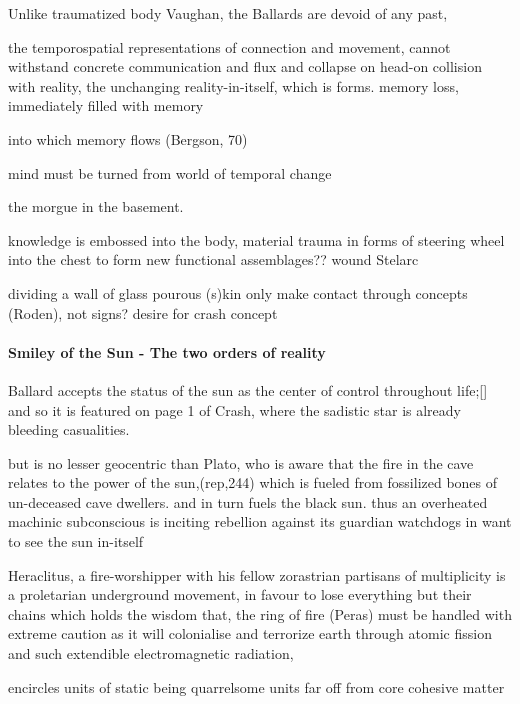 \documentclass{article}
\begin{document}
Unlike traumatized body Vaughan, 
the Ballards are devoid of any past, 


the temporospatial representations of connection and movement, 
cannot withstand concrete communication and flux and 
collapse
on head-on collision with reality,
the unchanging reality-in-itself, which is forms.
memory loss, 
 immediately filled with memory

into which memory flows (Bergson, 70)


mind must be turned from world of temporal change


the morgue in the basement.










knowledge is embossed into the body, 
material trauma in forms of steering wheel into the chest
to form new functional assemblages??
wound Stelarc






dividing a wall of glass  pourous (s)kin
only make contact through concepts (Roden), not signs? desire for crash
concept



\paragraph{Smiley of the Sun - The two orders of reality}

Ballard accepts the status of the sun as the center of control throughout life;[] 
and so it is featured on page 1 of Crash, where the sadistic star is already bleeding casualities.

but is no lesser geocentric than Plato, 
who is aware that the fire in the cave relates to the power of the sun,(rep,244)  
which is fueled from fossilized bones of un-deceased cave dwellers.
and in turn fuels the black sun.
thus an overheated machinic subconscious is inciting 
rebellion against its guardian watchdogs in want to see the sun in-itself

Heraclitus, a fire-worshipper with his fellow zorastrian partisans of multiplicity 
is a proletarian underground movement, 
in favour to lose everything but their chains
which holds the wisdom that, the ring of fire (Peras) must be handled with extreme caution
as it will colonialise and terrorize earth through 
atomic fission and such extendible electromagnetic radiation, 


encircles units of static being
quarrelsome  
units far off from core 
cohesive matter
\end{document}

